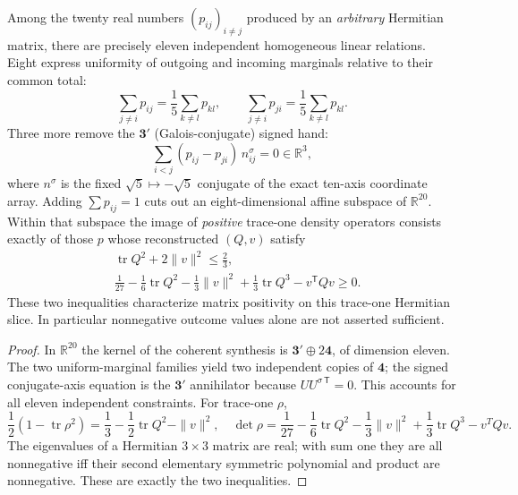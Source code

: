 \documentclass[12pt,a4paper]{article}
\begin{document}
\begin{proposition}
\label{p2c:prop:cc12-directed-probability-constraints}
Among the twenty real numbers $(p_{ij})_{i\ne j}$ produced by an
\emph{arbitrary} Hermitian matrix, there are precisely eleven
independent homogeneous linear relations. Eight express uniformity
of outgoing and incoming marginals relative to their common total:
\[
 \sum_{j\ne i}p_{ij}=\frac15\sum_{k\ne l}p_{kl},\qquad
 \sum_{j\ne i}p_{ji}=\frac15\sum_{k\ne l}p_{kl}.
\]
Three more remove the $\mathbf3'$ (Galois-conjugate) signed hand:
\[
 \boxed{\sum_{i<j}(p_{ij}-p_{ji})\,n_{ij}^{\sigma}=0\in\mathbb R^3,}
\]
where $n^\sigma$ is the fixed $\sqrt5\mapsto-\sqrt5$
conjugate of the exact ten-axis coordinate array.
Adding $\sum p_{ij}=1$ cuts out an eight-dimensional affine
subspace of $\mathbb R^{20}$. Within that subspace the image of
\emph{positive} trace-one density operators consists exactly of
those $p$ whose reconstructed $(Q,v)$ satisfy
\[
 \boxed{\begin{aligned}
 &\operatorname{tr}Q^2+2\|v\|^2\le\frac23,\\
 &\frac1{27}-\frac16\operatorname{tr}Q^2-\frac13\|v\|^2
     +\frac13\operatorname{tr}Q^3-v^{\mathsf T}Qv\ge0.
 \end{aligned}}
\]
These two inequalities characterize matrix positivity on this
trace-one Hermitian slice. In particular nonnegative outcome values
alone are not asserted sufficient.
\end{proposition}
\begin{proof}
In $\mathbb R^{20}$ the kernel of the coherent synthesis is
$\mathbf3'\oplus2\mathbf4$, of dimension eleven.
The two uniform-marginal families yield two independent copies of
$\mathbf4$; the signed conjugate-axis equation is the $\mathbf3'$
annihilator because $UU^{\sigma\,\mathsf T}=0$. This accounts for
all eleven independent constraints. For trace-one $\rho$,
\[
 \frac12(1-\operatorname{tr}\rho^2)
 =\frac13-\frac12\operatorname{tr}Q^2-\|v\|^2,
\quad
\det\rho=\frac1{27}-\frac16\operatorname{tr}Q^2
 -\frac13\|v\|^2+\frac13\operatorname{tr}Q^3-v^TQv.
\]
The eigenvalues of a Hermitian $3\times3$ matrix are real; with sum
one they are all nonnegative iff their second elementary symmetric
polynomial and product are nonnegative. These are exactly the two
inequalities.
\end{proof}
\end{document}
